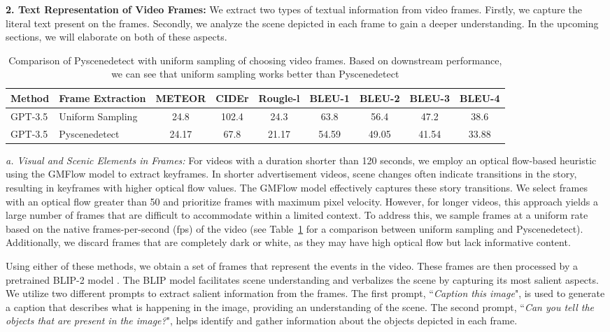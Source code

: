 \noindent \textbf{2. Text Representation of Video Frames:} We extract two types of textual information from video frames. Firstly, we capture the literal text present on the frames. Secondly, we analyze the scene depicted in each frame to gain a deeper understanding. In the upcoming sections, we will elaborate on both of these aspects.


\begin{table}[!h]\centering
\begin{adjustbox}{width =\textwidth}
\begin{tabular}{llccccccc}\toprule[1.5pt]
\textbf{Method} &\textbf{Frame Extraction} &\textbf{METEOR} & \textbf{CIDEr} &\textbf{Rougle-l} &\textbf{BLEU-1}&\textbf{BLEU-2}&\textbf{BLEU-3}&\textbf{BLEU-4}\\\toprule[0.5pt]
GPT-3.5 & Uniform Sampling & 24.8 & 102.4 & 24.3 & 63.8 & 56.4 & 47.2 & 38.6 \\
GPT-3.5 & Pyscenedetect & 24.17 & 67.8 & 21.17 & 54.59 & 49.05 & 41.54 & 33.88 \\\bottomrule[1.5pt]
\end{tabular}
\end{adjustbox}
\caption{Comparison of Pyscenedetect \cite{breakthrough-pyscenedetect} with uniform sampling of choosing video frames. Based on downstream performance, we can see that uniform sampling works better than Pyscenedetect  \label{tab:ablation-sampling}}
\end{table}

\textit{a. Visual and Scenic Elements in Frames:} For videos with a duration shorter than 120 seconds, we employ an optical flow-based heuristic using the GMFlow model \cite{xu2022gmflow} to extract keyframes. In shorter advertisement videos, scene changes often indicate transitions in the story, resulting in keyframes with higher optical flow values. The GMFlow model effectively captures these story transitions. We select frames with an optical flow greater than 50 and prioritize frames with maximum pixel velocity. However, for longer videos, this approach yields a large number of frames that are difficult to accommodate within a limited context. To address this, we sample frames at a uniform rate based on the native frames-per-second (fps) of the video (see Table~\ref{tab:ablation-sampling} for a comparison between uniform sampling and Pyscenedetect). Additionally, we discard frames that are completely dark or white, as they may have high optical flow but lack informative content.

Using either of these methods, we obtain a set of frames that represent the events in the video. These frames are then processed by a pretrained BLIP-2 model \cite{li2023blip2}. The BLIP model facilitates scene understanding and verbalizes the scene by capturing its most salient aspects. We utilize two different prompts to extract salient information from the frames. The first prompt, ``\textit{Caption this image}", is used to generate a caption that describes what is happening in the image, providing an understanding of the scene. The second prompt, ``\textit{Can you tell the objects that are present in the image?}", helps identify and gather information about the objects depicted in each frame.



